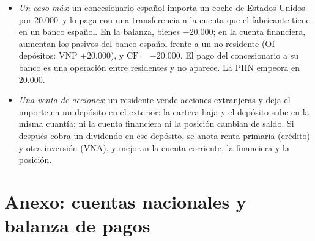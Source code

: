 \documentclass[11pt]{article}
\begin{document}
\begin{itemize}
\item \emph{Un caso más}: un concesionario español importa un coche de Estados Unidos por 20.000~y lo paga con una transferencia a la cuenta que el fabricante tiene en un banco español. En la balanza, bienes $-20.000$; en la cuenta financiera, aumentan los pasivos del banco español frente a un no residente (OI depósitos: VNP $+20.000$), y $\mathrm{CF}=-20.000$. El pago del concesionario a su banco es una operación entre residentes y no aparece. La PIIN empeora en 20.000.
\item \emph{Una venta de acciones}: un residente vende acciones extranjeras y deja el importe en un depósito en el exterior: la cartera baja y el depósito sube en la misma cuantía; ni la cuenta financiera ni la posición cambian de saldo. Si después cobra un dividendo en ese depósito, se anota renta primaria (crédito) y otra inversión (VNA), y mejoran la cuenta corriente, la financiera y la posición.
\end{itemize}

\section{Anexo: cuentas nacionales y balanza de pagos}\label{anexo:cn-bp}
\end{document}
